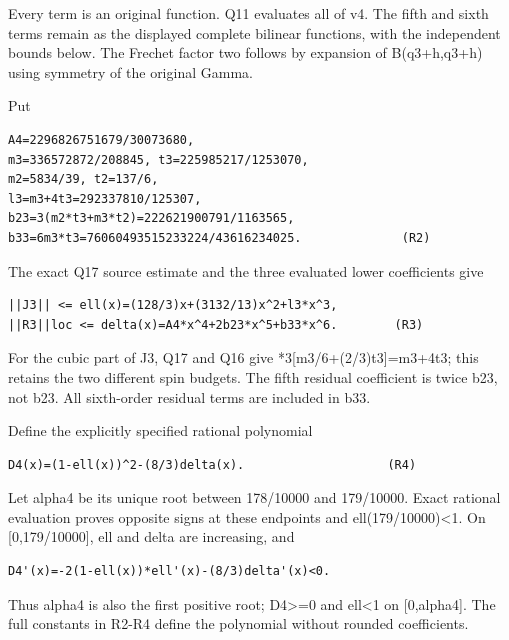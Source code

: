 \documentclass[11pt,a4paper]{article}
\renewcommand{\[}{\begingroup\small\originaldisplaystart}
\renewcommand{\]}{\originaldisplayend\endgroup}
\begin{document}
Every term is an original function. Q11 evaluates all of v4. The fifth
and sixth terms remain as the displayed complete bilinear functions,
with the independent bounds below. The Frechet factor two follows by
expansion of B(q3+h,q3+h) using symmetry of the original Gamma.

Put

\begin{verbatim}
A4=2296826751679/30073680,
m3=336572872/208845, t3=225985217/1253070,
m2=5834/39, t2=137/6,
l3=m3+4t3=292337810/125307,
b23=3(m2*t3+m3*t2)=222621900791/1163565,
b33=6m3*t3=76060493515233224/43616234025.              (R2)
\end{verbatim}

The exact Q17 source estimate and the three evaluated lower coefficients
give

\begin{verbatim}
||J3|| <= ell(x)=(128/3)x+(3132/13)x^2+l3*x^3,
||R3||loc <= delta(x)=A4*x^4+2b23*x^5+b33*x^6.        (R3)
\end{verbatim}

For the cubic part of J3, Q17 and Q16 give
{\allowbreak{}*\allowbreak{}3\allowbreak{}[\allowbreak{}m\allowbreak{}3\allowbreak{}/\allowbreak{}6\allowbreak{}+\allowbreak{}(\allowbreak{}2\allowbreak{}/\allowbreak{}3\allowbreak{})\allowbreak{}t\allowbreak{}3\allowbreak{}]\allowbreak{}=\allowbreak{}m\allowbreak{}3\allowbreak{}+\allowbreak{}4\allowbreak{}t\allowbreak{}3\allowbreak{}};
this retains the two different spin budgets. The fifth residual
coefficient is twice b23, not b23. All sixth-order residual terms are
included in b33.

Define the explicitly specified rational polynomial

\begin{verbatim}
D4(x)=(1-ell(x))^2-(8/3)delta(x).                    (R4)
\end{verbatim}

Let alpha4 be its unique root between 178/10000 and 179/10000. Exact
rational evaluation proves opposite signs at these endpoints and
ell(179/10000)\textless1. On {[}0,179/10000{]}, ell and delta are
increasing, and

\begin{verbatim}
D4'(x)=-2(1-ell(x))*ell'(x)-(8/3)delta'(x)<0.
\end{verbatim}

Thus alpha4 is also the first positive root; D4\textgreater=0 and
ell\textless1 on {[}0,alpha4{]}. The full constants in R2-R4 define the
polynomial without rounded coefficients.
\end{document}
